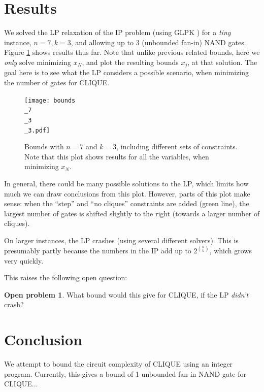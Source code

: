 \documentclass[12pt]{article}
\theoremstyle{definition}
\newtheorem{prob}{Open problem}[section]
\begin{document}
\section{Results}

We solved the LP relaxation of the IP problem (using GLPK \cite{glpk})
for a {\em tiny} instance, $n=7, k=3$, and allowing up to 3 (unbounded fan-in)
NAND gates.
Figure \ref{fig:bounds0} shows results thus far.
Note that unlike previous related bounds, here we {\em only} solve minimizing
$x_N$, and plot the resulting bounds $x_j$, at that solution. The
goal here is to see what the LP considers a possible scenario, when
minimizing the number of gates for CLIQUE.

\begin{figure}

\centering

\texttt{[image: bounds\\\_7\\\_3\\\_3.pdf]}

\caption{
Bounds with $n=7$ and $k=3$, including different sets of constraints.
Note that this plot shows results for all the variables, when
minimizing $x_N$.
}
\label{fig:bounds0}

\end{figure}

In general, there could be many possible solutions to the LP, which
limits how much we can draw conclusions from this plot.
However, parts of this plot make sense: 
when the ``step'' and ``no cliques''
constraints are added (green line), the largest number of gates is shifted
slightly to the right (towards a larger number of cliques).

On larger instances, the LP crashes (using several different solvers). This
is presumably partly because the numbers in the IP add up to $2^{n \choose k}$,
which grows very quickly.

This raises the following open question:

\begin{prob}
What bound would this give for CLIQUE, if the LP {\em didn't} crash?
\end{prob}

\section{Conclusion}

We attempt to bound the circuit complexity of CLIQUE using an integer program.
Currently, this gives a bound
of 1 unbounded fan-in NAND gate for CLIQUE...
\end{document}
